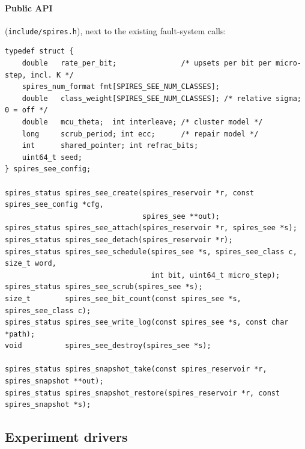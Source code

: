 \documentclass[11pt,a4paper]{article}
\begin{document}
\paragraph{Public API} (\texttt{include/spires.h}), next to the existing fault-system calls:
\begin{lstlisting}
typedef struct {
    double   rate_per_bit;               /* upsets per bit per micro-step, incl. K */
    spires_num_format fmt[SPIRES_SEE_NUM_CLASSES];
    double   class_weight[SPIRES_SEE_NUM_CLASSES]; /* relative sigma; 0 = off */
    double   mcu_theta;  int interleave; /* cluster model */
    long     scrub_period; int ecc;      /* repair model */
    int      shared_pointer; int refrac_bits;
    uint64_t seed;
} spires_see_config;

spires_status spires_see_create(spires_reservoir *r, const spires_see_config *cfg,
                                spires_see **out);
spires_status spires_see_attach(spires_reservoir *r, spires_see *s);
spires_status spires_see_detach(spires_reservoir *r);
spires_status spires_see_schedule(spires_see *s, spires_see_class c, size_t word,
                                  int bit, uint64_t micro_step);
spires_status spires_see_scrub(spires_see *s);
size_t        spires_see_bit_count(const spires_see *s, spires_see_class c);
spires_status spires_see_write_log(const spires_see *s, const char *path);
void          spires_see_destroy(spires_see *s);

spires_status spires_snapshot_take(const spires_reservoir *r, spires_snapshot **out);
spires_status spires_snapshot_restore(spires_reservoir *r, const spires_snapshot *s);
\end{lstlisting}

\subsection{Experiment drivers}
\end{document}
